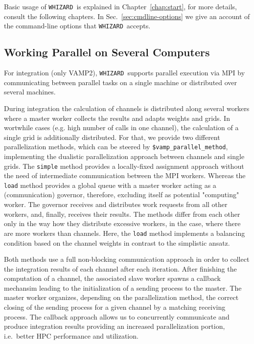\documentclass[12pt]{book}
\newcommand{\ttt}[1]{\texttt{#1}}
\newcommand{\whizard}{\ttt{WHIZARD}}
\begin{document}
Basic usage of \whizard\ is explained in Chapter~\ref{chap:start}, for
more details, consult the following chapters.  In
Sec.~\ref{sec:cmdline-options} we give an account of the command-line
options that \whizard\ accepts.

\subsection{Working Parallel on Several Computers}
\label{sec:mpi}

For integration (only VAMP2), \whizard\ supports parallel execution via MPI by communicating between parallel tasks on a single machine or distributed over several machines.

During integration the calculation of channels is distributed along several workers where a master worker collects the results and adapts weights and grids.
In wortwhile cases (e.g. high number of calls in one channel), the calculation of a single grid is additionally distributed.
For that, we provide two different parallelization methods, which can be steered by
\verb|$vamp_parallel_method|, implementing the dualistic parallelization approach between channels and single grids. The \ttt{simple} method provides a locally-fixed assignment approach without the need of intermediate communication between the MPI workers.
Whereas the \ttt{load} method provides a global queue with a master worker acting as a (communication) governor, therefore, excluding itself as potential "computing" worker.
The governor receives and distributes work requests from all other workers, and, finally, receives their results.
The methods differ from each other only in the way how they distribute excessive workers, in the case, where there are more workers than channels.
Here, the \ttt{load} method implements a balancing condition based on the channel weights in contrast to the simplistic ansatz.

Both methods use a full non-blocking communication approach in order to collect the integration results of each channel after each iteration.
After finishing the computation of a channel, the associated slave worker spawns a callback mechansim leading to the initialization of a sending process to the master.
The master worker organizes, depending on the parallelization method, the correct closing of the sending process for a given channel by a matching receiving process.
The callback approach allows us to concurrently communicate and produce integration results providing an increased parallelization portion, i.e.\ better HPC performance and utilization.
\end{document}
